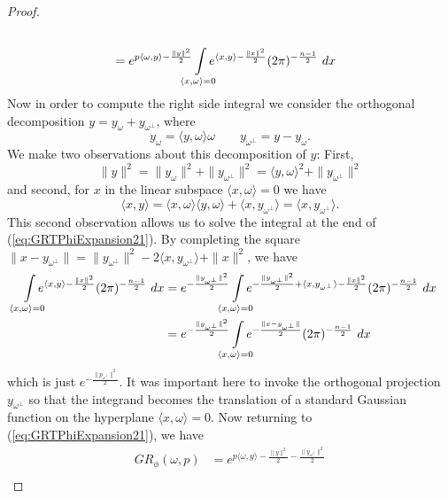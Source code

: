 \begin{proof}
\begin{equation}
\begin{split}
      \\&= e^{p \langle \omega, y\rangle - \frac{\|y\|^2}2} \int\mclimits_{\langle x, \omega\rangle = 0}e^{\langle x, y\rangle - \frac{\|x\|^2}2} (2\pi)^{-\frac{n-1}2} ~dx
    \end{split}
  \end{equation}
  Now in order to compute the right side integral we consider the orthogonal decomposition $y = y_\omega + y_{\omega^\perp}$, where
  \[
    y_\omega = \langle y, \omega \rangle \omega \qquad y_{\omega^\perp} = y - y_\omega.
  \]
  We make two observations about this decomposition of $y$: First, 
  \begin{equation}\label{eq:GRTPhiExpansion22}
    \|y\|^2 
      = \|y_\omega\|^2 + \|y_{\omega^\perp}\|^2 
      = \langle y, \omega\rangle^2 + \|y_{\omega^\perp}\|^2
  \end{equation}
  and second, for $x$ in the linear subspace $\langle x, \omega\rangle = 0$ we have
  \[
    \langle x, y \rangle
      = \langle x, \omega \rangle \langle y, \omega \rangle + \langle x, y_{\omega^\perp} \rangle 
      = \langle x, y_{\omega^\perp} \rangle.
  \]
  This second observation allows us to solve the integral at the end of (\ref{eq:GRTPhiExpansion21}). By completing the square $\|x - y_{\omega^\perp}\| = \|y_{\omega^\perp}\|^2 - 2\langle x, y_{\omega^\perp} \rangle + \|x\|^2$, we have
  \begin{align*}
    \int\mclimits_{\langle x, \omega\rangle = 0}e^{\langle x, y\rangle - \frac{\|x\|^2}2} (2\pi)^{-\frac{n-1}2} ~dx
      &= e^{-\frac{\|y_{\omega^\perp}\|^2}2} \int\mclimits_{\langle x, \omega\rangle = 0}e^{-\frac{\|y_{\omega^\perp}\|^2}2 + \langle x, y_{\omega^\perp}\rangle - \frac{\|x\|^2}2} (2\pi)^{-\frac{n-1}2} ~dx
    \\&= e^{-\frac{\|y_{\omega^\perp}\|^2}2} \int\mclimits_{\langle x, \omega\rangle = 0}e^{-\frac{\|x - y_{\omega^\perp}\|}2} (2\pi)^{-\frac{n-1}2} ~dx
  \end{align*}
  which is just $e^{-\frac{\|p_{\omega^\perp}\|^2}2}$. It was important here to invoke the orthogonal projection $y_{\omega^\perp}$ so that the integrand becomes the translation of a standard Gaussian function on the hyperplane $\langle x, \omega \rangle = 0$. Now returning to (\ref{eq:GRTPhiExpansion21}), we have
  \begin{align*}
    GR_{\phi}(\omega, p) 
      &= e^{p \langle \omega, y\rangle - \frac{\|y\|^2}2-\frac{\|y_{\omega^\perp}\|^2}2}
    \\

\end{align*}
\end{proof}
